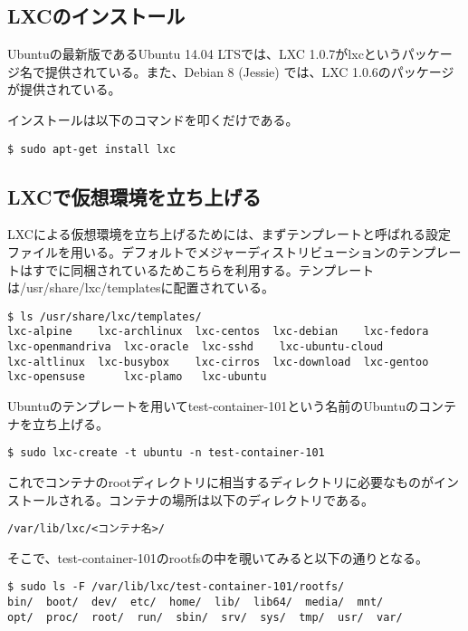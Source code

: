 \documentclass[9pt,b5paper,tombo]{jsbook}
\begin{document}
\subsection{LXCのインストール}
Ubuntuの最新版であるUbuntu 14.04 LTSでは、LXC 1.0.7がlxcというパッケージ名で提供されている。また、Debian 8 (Jessie) では、LXC 1.0.6のパッケージが提供されている。

\noindent
インストールは以下のコマンドを叩くだけである。

\begin{lstlisting}
$ sudo apt-get install lxc
\end{lstlisting}

\subsection{LXCで仮想環境を立ち上げる}
LXCによる仮想環境を立ち上げるためには、まずテンプレートと呼ばれる設定ファイルを用いる。デフォルトでメジャーディストリビューションのテンプレートはすでに同梱されているためこちらを利用する。テンプレートは/usr/share/lxc/templatesに配置されている。

\begin{lstlisting}
$ ls /usr/share/lxc/templates/
lxc-alpine    lxc-archlinux  lxc-centos  lxc-debian    lxc-fedora  lxc-openmandriva  lxc-oracle  lxc-sshd    lxc-ubuntu-cloud
lxc-altlinux  lxc-busybox    lxc-cirros  lxc-download  lxc-gentoo  lxc-opensuse      lxc-plamo	 lxc-ubuntu
\end{lstlisting}

\noindent
Ubuntuのテンプレートを用いてtest-container-101という名前のUbuntuのコンテナを立ち上げる。

\begin{lstlisting}
$ sudo lxc-create -t ubuntu -n test-container-101
\end{lstlisting}

\noindent
これでコンテナのrootディレクトリに相当するディレクトリに必要なものがインストールされる。コンテナの場所は以下のディレクトリである。

\begin{lstlisting}
/var/lib/lxc/<コンテナ名>/
\end{lstlisting}

\noindent
そこで、test-container-101のrootfsの中を覗いてみると以下の通りとなる。

\begin{lstlisting}
$ sudo ls -F /var/lib/lxc/test-container-101/rootfs/
bin/  boot/  dev/  etc/  home/	lib/  lib64/  media/  mnt/
opt/  proc/  root/	run/  sbin/  srv/  sys/  tmp/  usr/  var/
\end{lstlisting}
\end{document}
